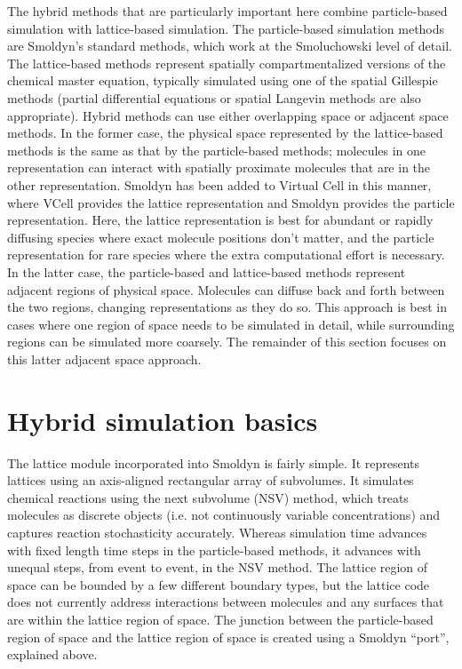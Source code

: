 \documentclass {scrbook}
\begin{document}
The hybrid methods that are particularly important here combine particle-based simulation with lattice-based simulation. The particle-based simulation methods are Smoldyn's standard methods, which work at the Smoluchowski level of detail. The lattice-based methods represent spatially compartmentalized versions of the chemical master equation, typically simulated using one of the spatial Gillespie methods (partial differential equations or spatial Langevin methods are also appropriate). Hybrid methods can use either overlapping space or adjacent space methods. In the former case, the physical space represented by the lattice-based methods is the same as that by the particle-based methods; molecules in one representation can interact with spatially proximate molecules that are in the other representation. Smoldyn has been added to Virtual Cell in this manner, where VCell provides the lattice representation and Smoldyn provides the particle representation. Here, the lattice representation is best for abundant or rapidly diffusing species where exact molecule positions don't matter, and the particle representation for rare species where the extra computational effort is necessary. In the latter case, the particle-based and lattice-based methods represent adjacent regions of physical space. Molecules can diffuse back and forth between the two regions, changing representations as they do so. This approach is best in cases where one region of space needs to be simulated in detail, while surrounding regions can be simulated more coarsely. The remainder of this section focuses on this latter adjacent space approach.

\section{Hybrid simulation basics}

The lattice module incorporated into Smoldyn is fairly simple. It represents lattices using an axis-aligned rectangular array of subvolumes. It simulates chemical reactions using the next subvolume (NSV) method, which treats molecules as discrete objects (i.e. not continuously variable concentrations) and captures reaction stochasticity accurately. Whereas simulation time advances with fixed length time steps in the particle-based methods, it advances with unequal steps, from event to event, in the NSV method. The lattice region of space can be bounded by a few different boundary types, but the lattice code does not currently address interactions between molecules and any surfaces that are within the lattice region of space. The junction between the particle-based region of space and the lattice region of space is created using a Smoldyn ``port'', explained above.
\end{document}
